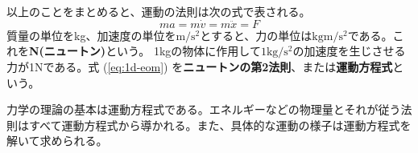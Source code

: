 \documentclass[a4paper, uplatex]{jsarticle}
\numberwithin{equation}{section}
\numberwithin{figure}{section}
\numberwithin{table}{section}
\begin{document}
以上のことをまとめると、運動の法則は次の式で表される。
\begin{equation}
  ma = m\dot{v} = m\ddot{x} = F
  \label{eq:1d-eom}
\end{equation}
質量の単位をkg、加速度の単位を\(\mathrm{m/s^2}\)とすると、力の単位は\(\mathrm{kgm/s^2}\)である。これを\textbf{N(ニュートン)}という。
1kgの物体に作用して\(\mathrm{1kg/s^2}\)の加速度を生じさせる力が1Nである。式 (\ref{eq:1d-eom}) を\textbf{ニュートンの第2法則}、または\textbf{運動方程式}という。

力学の理論の基本は運動方程式である。エネルギーなどの物理量とそれが従う法則はすべて運動方程式から導かれる。また、具体的な運動の様子は運動方程式を解いて求められる。
\end{document}
